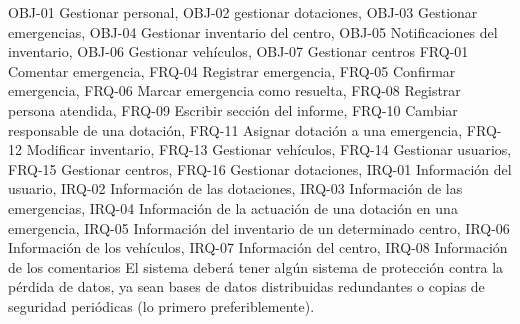 {\reportauthors}
{}
{OBJ-01 Gestionar personal, OBJ-02 gestionar dotaciones, OBJ-03 Gestionar emergencias, OBJ-04 Gestionar inventario del centro, OBJ-05 Notificaciones del inventario, OBJ-06 Gestionar vehículos, OBJ-07 Gestionar centros}
{FRQ-01 Comentar emergencia, FRQ-04 Registrar emergencia, FRQ-05 Confirmar emergencia, FRQ-06 Marcar emergencia como resuelta, FRQ-08 Registrar persona atendida, FRQ-09 Escribir sección del informe, FRQ-10 Cambiar responsable de una dotación, FRQ-11 Asignar dotación a una emergencia, FRQ-12 Modificar inventario, FRQ-13 Gestionar vehículos, FRQ-14 Gestionar usuarios, FRQ-15 Gestionar centros, FRQ-16 Gestionar dotaciones, IRQ-01 Información del usuario, IRQ-02 Información de las dotaciones, IRQ-03 Información de las emergencias, IRQ-04 Información de la actuación de una dotación en una emergencia, IRQ-05 Información del inventario de un determinado centro, IRQ-06 Información de los vehículos, IRQ-07 Información del centro, IRQ-08 Información de los comentarios}
{El sistema deberá tener algún sistema de protección contra la pérdida de datos, ya sean bases de datos distribuidas redundantes o copias de seguridad periódicas (lo primero preferiblemente).}

